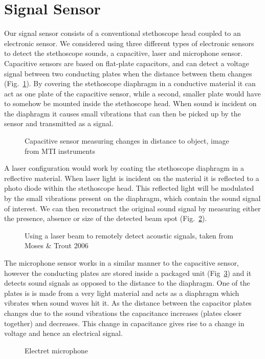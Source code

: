 \section{Signal Sensor}
Our signal sensor consists of a conventional stethoscope head coupled to an electronic sensor. We considered using three different types of electronic sensors to detect the stethoscope sounds, a capacitive, laser and microphone sensor. Capacitive sensors are based on flat-plate capacitors, and can detect a voltage signal between two conducting plates when the distance between them changes\cite[p.104]{Regtien2012} (Fig.~\ref{fig:cap_sensor}). By covering the stethoscope diaphragm in a conductive material it can act as one plate of the capacitive sensor, while a second, smaller plate would have to somehow be mounted inside the stethoscope head. When sound is incident on the diaphragm it causes small vibrations that can then be picked up by the sensor and transmitted as a signal.
\begin{figure}[!tbh]
	\centering
	\caption{Capacitive sensor measuring changes in distance to object, image from MTI instruments\cite{MTI_capsensor}}
	\label{fig:cap_sensor}
\end{figure}
A laser configuration would work by coating the stethoscope diaphragm in a reflective material. When laser light is incident on the material it is reflected to a photo diode within the stethoscope head. This reflected light will be modulated by the small vibrations present on the diaphragm, which contain the sound signal of interest. We can then reconstruct the original sound signal by measuring either the presence, absence or size of the detected beam spot\cite{laserMic} (Fig.~\ref{fig:laser_sensor}).  
\begin{figure}[!tb]
	\centering
	\caption{Using a laser beam to remotely detect acoustic signals, taken from  Moses \& Trout 2006 \cite{laserMic}}
	\label{fig:laser_sensor}
\end{figure}
The microphone sensor works in a similar manner to the capacitive sensor, however the conducting plates are stored inside a packaged unit (Fig~\ref{fig:mic_condenser}) and it detects sound signals as opposed to the distance to the diaphragm. One of the plates is is made from a very light material and acts as a diaphragm which vibrates when sound waves hit it. As the distance between the capacitor plates changes due to the sound vibrations the capacitance increases (plates closer together) and decreases. This change in capacitance gives rise to a change in voltage and hence an electrical signal. 
\begin{figure}[!tb]
	\centering
	\caption{Electret microphone}
	\label{fig:mic_condenser}
\end{figure}

